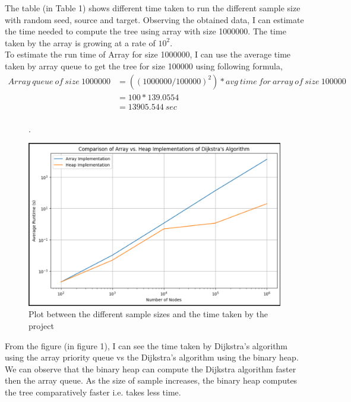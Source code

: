 \documentclass[12pt]{article}
\begin{document}
\noindent The table (in Table 1) shows different time taken to run the different sample size with random seed, source and target. Observing the obtained data, I can estimate the time needed to compute the tree using array with size 1000000. The time taken by the array is growing at a rate of $10^2$.\\
To estimate the run time of Array for size 1000000, I can use the average time taken by array queue to get the tree for size 100000 using following formula,\\
\begin{equation*} %
    \begin{split}
        Array\ queue\ of\ size\ 1000000 & = ((1000000/100000)^2) * avg\ time\ for\ array\ of\ size\ 100000  \\
        & = 100 * 139.0554\\
        & = 13905.544 \ sec \\
    \end{split}
\end{equation*}


\newpage

\begin{figure}[h]. %
    \begin{center}
      \includegraphics[width=0.80\linewidth]{figures/plot.png} 
      \caption{Plot between the different sample sizes and the time taken by the project}\label{fig:plot}
    \end{center}
  \end{figure}
\noindent From the figure (in figure 1), I can see the time taken by Dijkstra’s algorithm using the array priority queue vs the Dijkstra’s algorithm using the binary heap. We can observe that the binary heap can compute the Dijkstra algorithm faster then the array queue.
As the size of sample increases, the binary heap computes the tree comparatively faster i.e. takes less time.
\end{document}

